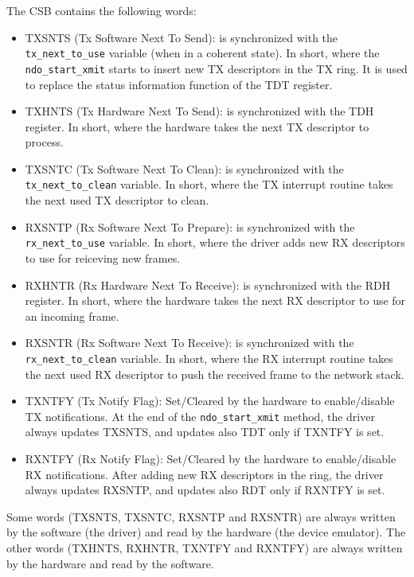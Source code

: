 The CSB contains the following words:
\begin{itemize}
  \item TXSNTS (Tx Software Next To Send): is synchronized with the \texttt{tx\_next\_to\_use} variable (when in a coherent state). In 
	short, where the \texttt{ndo\_start\_xmit} starts to insert new TX descriptors in the TX ring. It is used to replace the status
	information function of the TDT register.
	
  \item TXHNTS (Tx Hardware Next To Send): is synchronized with the TDH register. In short, where the hardware takes the next TX descriptor
	to process.
	
  \item TXSNTC (Tx Software Next To Clean): is synchronized with the \texttt{tx\_next\_to\_clean} variable. In short, where the TX interrupt
	routine takes the next used TX descriptor to clean.
	
  \item RXSNTP (Rx Software Next To Prepare): is synchronized with the \texttt{rx\_next\_to\_use} variable. In short, where the driver
	adds new RX descriptors to use for reiceving new frames.
	
  \item RXHNTR (Rx Hardware Next To Receive): is synchronized with the RDH register. In short, where the hardware takes the next RX
	descriptor to use for an incoming frame.
	
  \item RXSNTR (Rx Software Next To Receive): is synchronized with the \texttt{rx\_next\_to\_clean} variable. In short, where the RX 
	interrupt routine takes the next used RX descriptor to push the received frame to the network stack.
	
  \item TXNTFY (Tx Notify Flag): Set/Cleared by the hardware to enable/disable TX notifications. At the end of the
	\texttt{ndo\_start\_xmit} method, the driver always updates TXSNTS, and updates also TDT only if TXNTFY is set.
	
  \item RXNTFY (Rx Notify Flag): Set/Cleared by the hardware to enable/disable RX notifications. After adding new RX
	descriptors in the ring, the driver always updates RXSNTP, and updates also RDT only if RXNTFY is set.
\end{itemize}

Some words (TXSNTS, TXSNTC, RXSNTP and RXSNTR) are always written by the software (the driver) and read by the hardware (the device 
emulator).
The other words (TXHNTS, RXHNTR, TXNTFY and RXNTFY) are always written by the hardware and read by the software.

